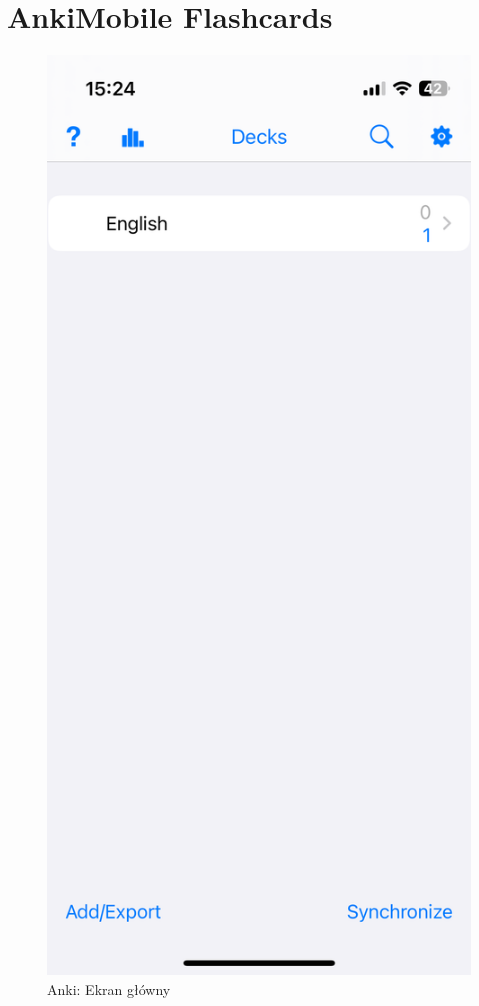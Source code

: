 \documentclass[final,a4paper,openany,12pt]{mwbk}
\begin{document}
\section{AnkiMobile Flashcards}

\begin{figure}[H]
\centering
\begin{minipage}{0.5\textwidth}
  \centering
\includegraphics[width=.75\linewidth]{img/anki1.PNG}
  \caption{Anki: Ekran główny}
  \label{fig:anki1}
\end{minipage}%
\begin{minipage}{0.5\textwidth}
  \centering

\end{minipage}
\end{figure}
\end{document}
